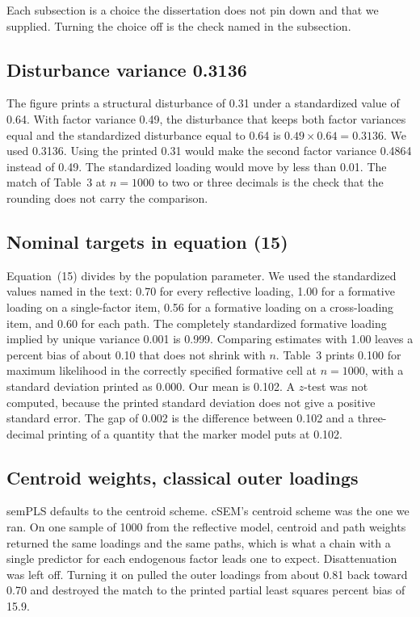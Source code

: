 \documentclass[11pt]{article}
\begin{document}
Each subsection is a choice the dissertation does not pin down and that we
supplied. Turning the choice off is the check named in the subsection.

\subsection{Disturbance variance 0.3136}

The figure prints a structural disturbance of 0.31 under a standardized
value of 0.64. With factor variance 0.49, the disturbance that keeps both
factor variances equal and the standardized disturbance equal to 0.64 is
$0.49 \times 0.64 = 0.3136$. We used 0.3136. Using the printed 0.31 would
make the second factor variance 0.4864 instead of 0.49. The standardized
loading would move by less than 0.01. The match of Table~3 at $n=1000$ to
two or three decimals is the check that the rounding does not carry the
comparison.

\subsection{Nominal targets in equation (15)}

Equation~(15) divides by the population parameter. We used the standardized
values named in the text: 0.70 for every reflective loading, 1.00 for a
formative loading on a single-factor item, 0.56 for a formative loading on
a cross-loading item, and 0.60 for each path. The completely standardized
formative loading implied by unique variance 0.001 is 0.999. Comparing
estimates with 1.00 leaves a percent bias of about 0.10 that does not
shrink with $n$. Table~3 prints 0.100 for maximum likelihood in the
correctly specified formative cell at $n=1000$, with a standard deviation
printed as 0.000. Our mean is 0.102. A $z$-test was not computed, because
the printed standard deviation does not give a positive standard error.
The gap of 0.002 is the difference between 0.102 and a three-decimal
printing of a quantity that the marker model puts at 0.102.

\subsection{Centroid weights, classical outer loadings}

semPLS defaults to the centroid scheme. cSEM's centroid scheme was the one
we ran. On one sample of 1000 from the reflective model, centroid and path
weights returned the same loadings and the same paths, which is what a
chain with a single predictor for each endogenous factor leads one to
expect. Disattenuation was left off. Turning it on pulled the outer
loadings from about 0.81 back toward 0.70 and destroyed the match to the
printed partial least squares percent bias of 15.9.
\end{document}
